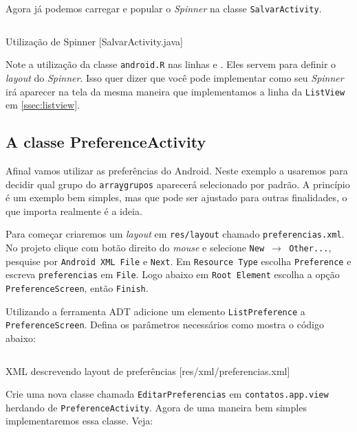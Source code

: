 Agora já podemos carregar e popular o \textit{Spinner} na classe \texttt{SalvarActivity}.

\begin{listing}[H]
  \inputminted[linenos=true,frame=bottomline,tabsize=3]{ java }{ source/SalvarActivity-6.java }
  \caption{Utilização de Spinner [SalvarActivity.java]}
\end{listing}

Note a utilização da classe \texttt{android.R} nas linhas  e . Eles servem
para definir o \textit{layout} do \textit{Spinner}. Isso quer dizer que você pode implementar como seu \textit{Spinner}
irá aparecer na tela da mesma maneira que implementamos a linha da \texttt{ListView} em \ref{ssec:listview}.

\subsection{A classe PreferenceActivity}

Afinal vamos utilizar as preferências do Android. Neste exemplo a usaremos para decidir qual grupo
do \texttt{array\b{ }grupos} aparecerá selecionado por padrão. A princípio é um exemplo bem simples, mas
que pode ser ajustado para outras finalidades, o que importa realmente é a ideia.

Para começar criaremos um \textit{layout} em \texttt{res/layout} chamado \texttt{preferencias.xml}.
No projeto clique com botão direito do \textit{mouse} e selecione \texttt{New $\rightarrow$ Other...},
pesquise por \texttt{Android XML File} e \texttt{Next}. Em \texttt{Resource Type} escolha
\texttt{Preference} e escreva \texttt{preferencias} em \texttt{File}. Logo abaixo em \texttt{Root Element}
escolha a opção \texttt{PreferenceScreen}, então \texttt{Finish}.

Utilizando a ferramenta ADT adicione um elemento \texttt{ListPreference} a \texttt{PreferenceScreen}.
Defina os parâmetros necessários como mostra o código abaixo:

\begin{listing}[H]
  \inputminted[linenos=true,frame=bottomline,tabsize=3]{ xml }{ source/preferencias-1.xml }
  \caption{XML descrevendo layout de preferências [res/xml/preferencias.xml]}
\end{listing}

Crie uma nova classe chamada \texttt{EditarPreferencias} em \texttt{contatos.app.view} herdando de
\texttt{PreferenceActivity}. Agora de uma maneira bem simples implementaremos essa classe. Veja:

